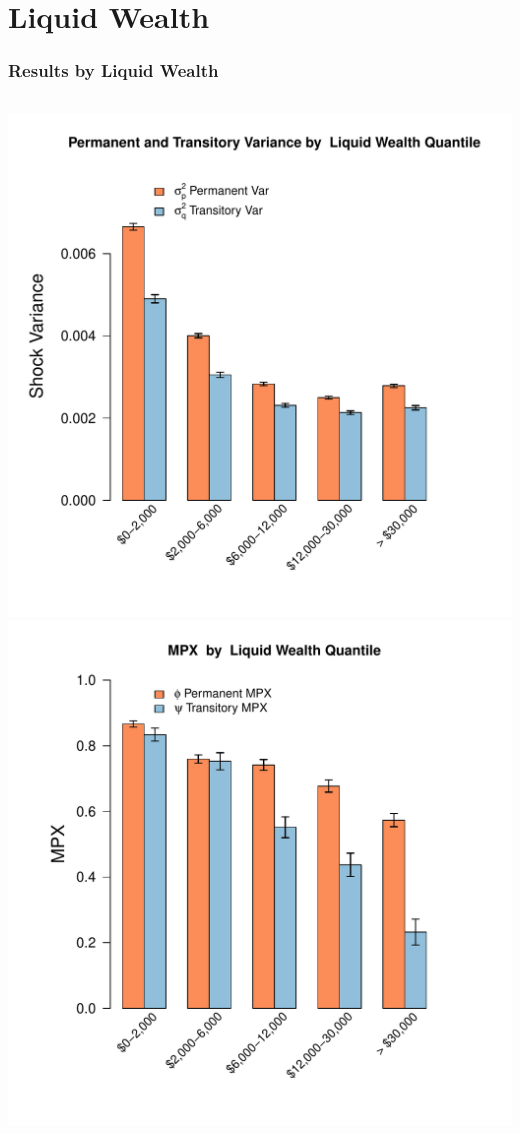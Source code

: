 \documentclass{beamer}
\begin{document}
\section{Liquid Wealth}
\frame
{
	\frametitle{Results by Liquid Wealth}
	\label{MPXbyLiquidWealth}
	\begin{columns}
		\centering
		\includegraphics[scale=0.35]{../Figures/VarianceByLiquidWealth_level_lincome_head.pdf}
		\centering
		\includegraphics[scale=0.35]{../Figures/MPXByLiquidWealth_level_lincome_head.pdf}
	\end{columns} 
	\hyperlink{MPXbyNetWealth}{}	
}
\end{document}
